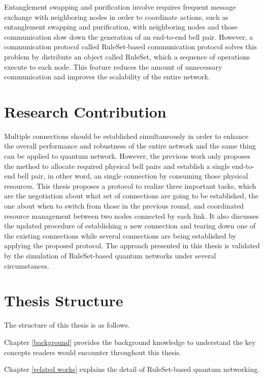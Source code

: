 Entanglement swapping and purification involve requires frequent message exchange with neighboring nodes in order to coordinate actions, such as entanglement swapping and purification, with neighboring nodes and those communication slow down the generation of an end-to-end bell pair.
However, a communication protocol \cite{matsuo2019quantum} called RuleSet-based communication protocol solves this problem by distribute an object called RuleSet, which a sequence of operations execute to each node. This feature reduces the amount of unnecessary communication and improves the scalability of the entire network.

\section{Research Contribution}
\label{introduction:research-contribution}

Multiple connections should be established simultaneously in order to enhance the overall performance and robustness of the entire network and the same thing can be applied to quantum network. 
However, the previous work only proposes the method to allocate required physical bell pairs and establish a single end-to-end bell pair, in other word, an single connection by consuming those physical resources.
This thesis proposes a protocol to realize three important tasks, which are the negotiation about what set of connections are going to be established, the one about when to switch from those in the previous round, and coordinated resource management between two nodes connected by each link.
It also discusses the updated procedure of establishing a new connection and tearing down one of the existing connections while several connections are being established by applying the proposed protocol.
The approach presented in this thesis is validated by the simulation of RuleSet-based quantum networks under several circumstances.

\section{Thesis Structure}
\label{introduction:thesis-structure} 

The structure of this thesis is as follows. 

Chapter \ref{background} provides the background knowledge to understand the key concepts readers would encounter throughout this thesis.

Chapter \ref{related works} explains the detail of RuleSet-based quantum networking.

